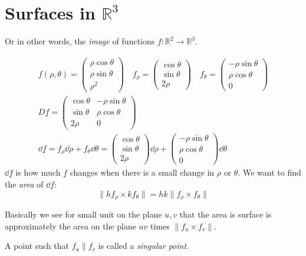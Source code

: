 \documentclass[00_complete]{subfiles}
\begin{document}
\section{Surfaces in \texorpdfstring{$\mathbb{R}^3$}{R3}}
Or in other words, the \emph{image} of functions $f: \mathbb{R}^2\to
\mathbb{R}^3$.
\begin{example}[Paraboloid]
    \begin{gather*}
        f(\rho,\theta)=\begin{pmatrix}
            \rho\cos\theta\\\rho\sin\theta\\\rho^2
        \end{pmatrix} \quad
        f_{\rho}=\begin{pmatrix}
            \cos\theta\\\sin\theta\\ 2\rho
        \end{pmatrix} \quad f_{\theta}=\begin{pmatrix}
            -\rho\sin\theta\\\rho\cos\theta\\ 0
        \end{pmatrix} \\
        D \underline f = \begin{pmatrix}
            \cos\theta &-\rho\sin\theta \\
            \sin\theta &\rho\cos\theta \\
            2\rho & 0
        \end{pmatrix} \\
        \dd{\underline f} = f_{\rho}\dd{\rho} + f_{\theta}\dd{\theta} =
        \begin{pmatrix}
            \cos\theta\\\sin\theta\\ 2\rho
        \end{pmatrix}\dd{\rho} + \begin{pmatrix}
            -\rho\sin\theta \\ \rho\cos\theta\\ 0
        \end{pmatrix}\dd{\theta}
    \end{gather*}
    $\dd{\underline f}$ is how much $\underline f$ changes when there is a
    small change in $\rho$ or $\theta$. We want to find the \emph{area} of
    $\dd{\underline f}$:
    $$\|h f_\rho \times k f_\theta\|=hk\|f_\rho\times f_\theta\|$$
\end{example}
Basically we see for small unit on the plane $u,v$ that the area is surface is
approximately the area on the plane $uv$ times $\|f_u \times f_v\|$.
\begin{definition}
    A point such that $f_u \parallel f_v$ is called a \emph{singular point}.
\end{definition}
\end{document}

